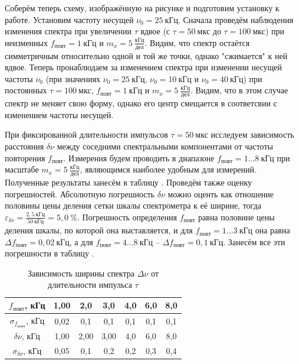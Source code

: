 \documentclass[a4paper,10pt]{article}
\begin{document}
Соберём теперь схему, изображённую на рисунке  и подготовим установку к работе. Установим частоту несущей $\nu_0=25~\text{кГц}$. Сначала проведём наблюдения изменения спектра при увеличении $\tau$ вдвое (с $\tau=50~\text{мкс}$ до $\tau=100~\text{мкс}$) при неизменных $f_{повт}=1~\text{кГц}$ и $m_x=5~\frac{\text{кГц}}{\text{дел}}$. Видим, что спектр остаётся симметричным относительно одной и той же точки, однако "сжимается" к ней вдвое. Теперь пронаблюдаем за изменением спектра при изменении несущей частоты $\nu_0$ (при значениях $\nu_0=25~\text{кГц}$, $\nu_0=10~\text{кГц}$ и $\nu_0=40~\text{кГц}$) при постоянных $\tau=100~\text{мкс}$, $f_{повт}=1~\text{кГц}$ и $m_x=5~\frac{\text{кГц}}{\text{дел}}$. Видим, что в этом случае спектр не меняет свою форму, однако его центр смещается в соответсвии с изменением частоты несущей.

При фиксированной длительности импульсов $\tau=50~\text{мкс}$ исследуем зависимость расстояния $\delta\nu$ между соседними спектральными компонентами от частоты повторения $f_{\text{повт}}$. Измерения будем проводить в диапазоне $f_{повт}=1\ldots8~\text{кГц}$ при масштабе $m_x=5~\frac{\text{кГц}}{\text{дел}}$, являющимся наиболее удобным для измерений. Полученные результаты занесём в таблицу . Проведём также оценку погрешностей. Абсолютную погрешность $\delta\nu$  можно оценть как отношение половины цены деления сетки шкалы спектрометра к её ширине, тогда $\varepsilon_{\delta\nu}=\frac{2,5~\text{кГц}}{50~\text{кГц}}=5,0~\%$. Погрешность определения $f_{повт}$ равна половине цены деления шкалы, по которой она выставляется, и для $f_{повт}=1\ldots3~\text{кГц}$ она равна $\Delta f_{повт}=0,02~\text{кГц}$, а для $f_{повт}=4\ldots8~\text{кГц}$ -- $\Delta f_{повт}=0,1~\text{кГц}$. Занесём все эти погрешности в таблицу .

\begin{table}[h]
	\centering
	\caption{Зависимость ширины спектра $\Delta\nu$ от длительности импульса $\tau$} \label{Table_B}
	\begin{tabular}{|c|c|c|c|c|c|c|}
		\hline
		$f_{повт}$, кГц & 1,00 & 2,0 & 3,0 & 4,0 & 6,0 & 8,0 \\ \hline
		$\sigma_{f_{повт}}$, кГц & 0,02 & 0,1 & 0,1 & 0,1 & 0,1 & 0,1 \\ \hline
		$\delta\nu$, кГц & 1,00 & 2,00 & 3,00 & 4,0 & 6,0 & 8,0 \\ \hline
		$\sigma_{\delta\nu}$, кГц & 0,05 & 0,1 & 0,2 & 0,2 & 0,3 & 0,4 \\ \hline
	\end{tabular}
\end{table}
\end{document}
